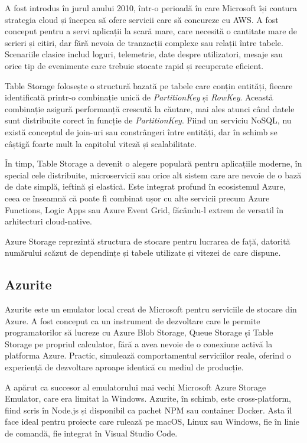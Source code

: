 A fost introdus în jurul anului 2010, într-o perioadă în care Microsoft își contura strategia cloud și începea să ofere servicii care să concureze cu AWS. A fost conceput pentru a servi aplicații la scară mare, care necesită o cantitate mare de scrieri și citiri, dar fără nevoia de tranzacții complexe sau relații între tabele. Scenariile clasice includ loguri, telemetrie, date despre utilizatori, mesaje sau orice tip de evenimente care trebuie stocate rapid și recuperate eficient. \parencite{azureStorage}

Table Storage folosește o structură bazată pe tabele care conțin entități, fiecare identificată printr-o combinație unică de \textit{PartitionKey} și \textit{RowKey}. Această combinație asigură performanță crescută la căutare, mai ales atunci când datele sunt distribuite corect în funcție de \textit{PartitionKey}. Fiind un serviciu NoSQL, nu există conceptul de join-uri sau constrângeri între entități, dar în schimb se câștigă foarte mult la capitolul viteză și scalabilitate. \parencite{azureStorage}

În timp, Table Storage a devenit o alegere populară pentru aplicațiile moderne, în special cele distribuite, microservicii sau orice alt sistem care are nevoie de o bază de date simplă, ieftină și elastică. Este integrat profund în ecosistemul Azure, ceea ce înseamnă că poate fi combinat ușor cu alte servicii precum Azure Functions, Logic Apps sau Azure Event Grid, făcându-l extrem de versatil în arhitecturi cloud-native. \parencite{azureStorage}

Azure Storage reprezintă structura de stocare pentru lucrarea de față, datorită numărului scăzut de dependințe și tabele utilizate și vitezei de care dispune.

\subsection{Azurite}

Azurite este un emulator local creat de Microsoft pentru serviciile de stocare din Azure. A fost conceput ca un instrument de dezvoltare care le permite programatorilor să lucreze cu Azure Blob Storage, Queue Storage și Table Storage pe propriul calculator, fără a avea nevoie de o conexiune activă la platforma Azure. Practic, simulează comportamentul serviciilor reale, oferind o experiență de dezvoltare aproape identică cu mediul de producție. \parencite{azurite}

A apărut ca succesor al emulatorului mai vechi Microsoft Azure Storage Emulator, care era limitat la Windows. Azurite, în schimb, este cross-platform, fiind scris în Node.js și disponibil ca pachet NPM sau container Docker. Asta îl face ideal pentru proiecte care rulează pe macOS, Linux sau Windows, fie în linie de comandă, fie integrat în Visual Studio Code. \parencite{azurite}

